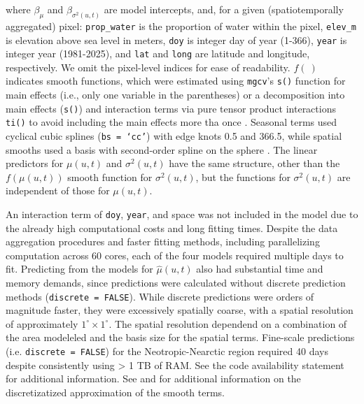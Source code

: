\documentclass{article}
\begin{document}
\noindent where $\beta_\mu$ and $\beta_{\sigma^2(u, t)}$ are model intercepts, and, for a given (spatiotemporally aggregated) pixel: \texttt{prop\_water} is the proportion of water within the pixel, \texttt{elev\_m} is elevation above sea level in meters, \texttt{doy} is integer day of year (1-366), \texttt{year} is integer year (1981-2025), and \texttt{lat} and \texttt{long} are latitude and longitude, respectively. We omit the pixel-level indices for ease of readability. $f(~)$ indicates smooth functions, which were estimated using \texttt{mgcv}'s \texttt{s()} function for main effects (i.e., only one variable in the parentheses) or a decomposition into main effects (\texttt{s()}) and interaction terms via pure tensor product interactions \texttt{ti()} to avoid including the main effects more tha once \citep{wood_generalized_2017}. Seasonal terms used cyclical cubic splines (\texttt{bs = `cc'}) with edge knots 0.5 and 366.5, while spatial smooths used a basis with second-order spline on the sphere \citep[\texttt{bs = `sos'}; ][]{wood_generalized_2017}. The linear predictors for $\mu(u, t)$ and $\sigma^2(u, t)$ have the same structure, other than the $f(\mu(u, t))$ smooth function for $\sigma^2(u, t)$, but the functions for $\sigma^2(u, t)$ are independent of those for $\mu(u, t)$.

An interaction term of \texttt{doy}, \texttt{year}, and space was not included in the model due to the already high computational costs and long fitting times. Despite the data aggregation procedures and faster fitting methods, including parallelizing computation across 60 cores, each of the four models required multiple days to fit. Predicting from the models for $\hat \mu(u, t)$ also had substantial time and memory demands, since predictions were calculated without discrete prediction methods (\texttt{discrete = FALSE}). While discrete predictions were orders of magnitude faster, they were excessively spatially coarse, with a spatial resolution of approximately $1^\circ \times 1^\circ$. The spatial resolution dependend on a combination of the area modeleled and the basis size for the spatial terms. Fine-scale predictions (i.e. \texttt{discrete = FALSE}) for the Neotropic-Nearctic region required 40 days despite consistently using > 1 TB of RAM. See the code availability statement for additional information. See \citet{wood_generalized_2017-1} and \citet{wood_generalized_2015} for additional information on the discretizatized approximation of the smooth terms.
\end{document}
